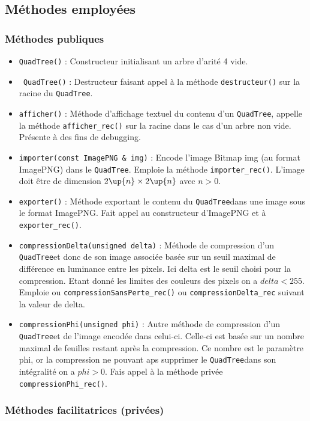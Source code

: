 \documentclass{article}
\newcommand{\info}{\texttt}
\newcommand{\qt}{\info{QuadTree}}
\begin{document}
    \subsection{Méthodes employées}

		\subsubsection{Méthodes publiques}
		
		\begin{itemize}
	    	\item \info{QuadTree()} : Constructeur initialisant un arbre d'arité 4 vide.
	    	\item \info{~QuadTree()} : Destructeur faisant appel à la méthode \info{destructeur()} sur la racine du \qt.
	    	\item \info{afficher()} : Méthode d'affichage textuel du contenu d'un \qt, appelle la méthode \info{afficher_rec()} sur la racine dans le cas d'un arbre non vide. Présente à des fins de debugging.
	    	\item \info{importer(const ImagePNG \& img)} : Encode l'image Bitmap img (au format ImagePNG) dans le \qt. Emploie la méthode \info{importer_rec()}. L'image doit être de dimension $2\up{n}\times2\up{n}$ avec $n>0$.
	    	\item \info{exporter()} : Méthode exportant le contenu du \qt dans une image sous le format ImagePNG. Fait appel au constructeur d'ImagePNG et à \info{exporter_rec()}.
	    	\item \info{compressionDelta(unsigned delta)} : Méthode de compression d'un \qt et donc de son image associée basée sur un seuil maximal de différence en luminance entre les pixels. Ici delta est le seuil choisi pour la compression. Etant donné les limites des couleurs des pixels on a $delta<255$. Emploie ou \info{compressionSansPerte_rec()} ou \info{compressionDelta_rec} suivant la valeur de delta.
	    	\item \info{compressionPhi(unsigned phi)} : Autre méthode de compression d'un \qt et de l'image encodée dans celui-ci. Celle-ci est basée sur un nombre maximal de feuilles restant après la compression. Ce nombre est le paramètre phi, or la compression ne pouvant aps supprimer le \qt dans son intégralité on a $phi>0$. Fais appel à la méthode privée \info{compressionPhi_rec()}.
	    \end{itemize}
	    
	    \subsubsection{Méthodes facilitatrices (privées)}
	    
\end{document}

